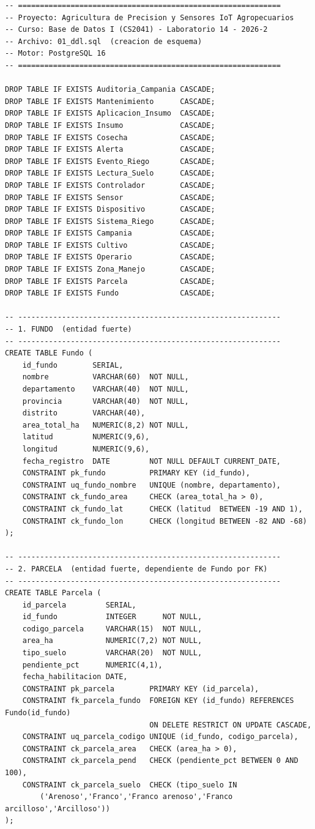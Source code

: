 \documentclass[11pt,letterpaper]{article}
\begin{document}
\begin{lstlisting}[style=sql, title={01\_ddl.sql}]
-- ============================================================
-- Proyecto: Agricultura de Precision y Sensores IoT Agropecuarios
-- Curso: Base de Datos I (CS2041) - Laboratorio 14 - 2026-2
-- Archivo: 01_ddl.sql  (creacion de esquema)
-- Motor: PostgreSQL 16
-- ============================================================

DROP TABLE IF EXISTS Auditoria_Campania CASCADE;
DROP TABLE IF EXISTS Mantenimiento      CASCADE;
DROP TABLE IF EXISTS Aplicacion_Insumo  CASCADE;
DROP TABLE IF EXISTS Insumo             CASCADE;
DROP TABLE IF EXISTS Cosecha            CASCADE;
DROP TABLE IF EXISTS Alerta             CASCADE;
DROP TABLE IF EXISTS Evento_Riego       CASCADE;
DROP TABLE IF EXISTS Lectura_Suelo      CASCADE;
DROP TABLE IF EXISTS Controlador        CASCADE;
DROP TABLE IF EXISTS Sensor             CASCADE;
DROP TABLE IF EXISTS Dispositivo        CASCADE;
DROP TABLE IF EXISTS Sistema_Riego      CASCADE;
DROP TABLE IF EXISTS Campania           CASCADE;
DROP TABLE IF EXISTS Cultivo            CASCADE;
DROP TABLE IF EXISTS Operario           CASCADE;
DROP TABLE IF EXISTS Zona_Manejo        CASCADE;
DROP TABLE IF EXISTS Parcela            CASCADE;
DROP TABLE IF EXISTS Fundo              CASCADE;

-- ------------------------------------------------------------
-- 1. FUNDO  (entidad fuerte)
-- ------------------------------------------------------------
CREATE TABLE Fundo (
    id_fundo        SERIAL,
    nombre          VARCHAR(60)  NOT NULL,
    departamento    VARCHAR(40)  NOT NULL,
    provincia       VARCHAR(40)  NOT NULL,
    distrito        VARCHAR(40),
    area_total_ha   NUMERIC(8,2) NOT NULL,
    latitud         NUMERIC(9,6),
    longitud        NUMERIC(9,6),
    fecha_registro  DATE         NOT NULL DEFAULT CURRENT_DATE,
    CONSTRAINT pk_fundo          PRIMARY KEY (id_fundo),
    CONSTRAINT uq_fundo_nombre   UNIQUE (nombre, departamento),
    CONSTRAINT ck_fundo_area     CHECK (area_total_ha > 0),
    CONSTRAINT ck_fundo_lat      CHECK (latitud  BETWEEN -19 AND 1),
    CONSTRAINT ck_fundo_lon      CHECK (longitud BETWEEN -82 AND -68)
);

-- ------------------------------------------------------------
-- 2. PARCELA  (entidad fuerte, dependiente de Fundo por FK)
-- ------------------------------------------------------------
CREATE TABLE Parcela (
    id_parcela         SERIAL,
    id_fundo           INTEGER      NOT NULL,
    codigo_parcela     VARCHAR(15)  NOT NULL,
    area_ha            NUMERIC(7,2) NOT NULL,
    tipo_suelo         VARCHAR(20)  NOT NULL,
    pendiente_pct      NUMERIC(4,1),
    fecha_habilitacion DATE,
    CONSTRAINT pk_parcela        PRIMARY KEY (id_parcela),
    CONSTRAINT fk_parcela_fundo  FOREIGN KEY (id_fundo) REFERENCES Fundo(id_fundo)
                                 ON DELETE RESTRICT ON UPDATE CASCADE,
    CONSTRAINT uq_parcela_codigo UNIQUE (id_fundo, codigo_parcela),
    CONSTRAINT ck_parcela_area   CHECK (area_ha > 0),
    CONSTRAINT ck_parcela_pend   CHECK (pendiente_pct BETWEEN 0 AND 100),
    CONSTRAINT ck_parcela_suelo  CHECK (tipo_suelo IN
        ('Arenoso','Franco','Franco arenoso','Franco arcilloso','Arcilloso'))
);


\end{lstlisting}
\end{document}
